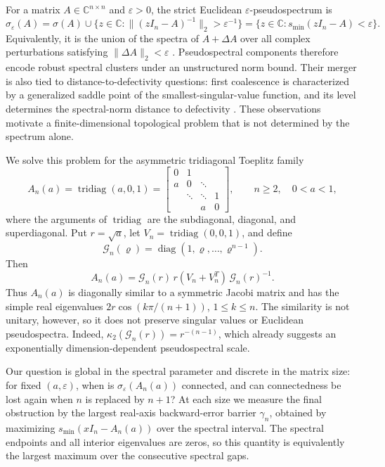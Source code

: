 \documentclass[a4paper,preprint,12pt,nopreprintline,sort&compress]{elsarticle}
\numberwithin{equation}{section}
\theoremstyle{remark}
\DeclareMathOperator{\diag}{diag}
\DeclareMathOperator{\tridiag}{tridiag}
\newcommand{\C}{\mathbb C}
\begin{document}
For a matrix \(A\in\C^{n\times n}\) and \(\varepsilon>0\), the strict Euclidean
\(\varepsilon\)-pseudospectrum is
\begin{equation}\label{eq:intro-pseudospectrum}
 \sigma_\varepsilon(A)
 =\sigma(A)\cup
 \{z\in\C:\lVert(zI_n-A)^{-1}\rVert_2>\varepsilon^{-1}\}
 =\{z\in\C:s_{\min}(zI_n-A)<\varepsilon\}.
\end{equation}
Equivalently, it is the union of the spectra of \(A+\Delta A\) over all
complex perturbations satisfying \(\lVert\Delta A\rVert_2<\varepsilon\)
\cite{TrefethenEmbree2005}.  Pseudospectral components therefore encode
robust spectral clusters under an unstructured norm bound.  Their merger is
also tied to distance-to-defectivity questions: first coalescence is
characterized by a generalized saddle point of the smallest-singular-value
function, and its level determines the spectral-norm distance to defectivity
\cite{AlamEtAl2011}.  These observations motivate a finite-dimensional
topological problem that is not determined by the spectrum alone.

We solve this problem for the asymmetric tridiagonal Toeplitz family
\begin{equation}\label{eq:A-matrix}
 A_n(a)=\tridiag(a,0,1)
 =\begin{bmatrix}
 0&1\\
 a&0&\ddots\\
 &\ddots&\ddots&1\\
 &&a&0
 \end{bmatrix},
 \qquad n\geq2,\quad 0<a<1,
\end{equation}
where the arguments of \(\tridiag\) are the subdiagonal, diagonal, and
superdiagonal.  Put \(r=\sqrt a\), let
\(V_n=\tridiag(0,0,1)\), and define
\[
 \mathcal G_n(\varrho)=\diag(1,\varrho,\ldots,\varrho^{n-1}).
\]
Then
\begin{equation}\label{eq:intro-similarity}
 A_n(a)=\mathcal G_n(r)\,r(V_n+V_n^T)\,\mathcal G_n(r)^{-1}.
\end{equation}
Thus \(A_n(a)\) is diagonally similar to a symmetric Jacobi matrix and has
the simple real eigenvalues
\(2r\cos(k\pi/(n+1))\), \(1\leq k\leq n\).  The similarity is not unitary,
however, so it does not preserve singular values or Euclidean
pseudospectra.  Indeed,
\(\kappa_2(\mathcal G_n(r))=r^{-(n-1)}\), which already suggests an
exponentially dimension-dependent pseudospectral scale.

Our question is global in the spectral parameter and discrete in the
matrix size: for fixed \((a,\varepsilon)\), when is
\(\sigma_\varepsilon(A_n(a))\) connected, and can connectedness be lost
again when \(n\) is replaced by \(n+1\)?  At each size we measure the final
obstruction by the largest real-axis backward-error barrier \(\gamma_n\),
obtained by maximizing \(s_{\min}(xI_n-A_n(a))\) over the spectral interval.
The spectral endpoints and all interior eigenvalues are zeros, so this
quantity is equivalently the largest maximum over the consecutive spectral
gaps.
\end{document}

